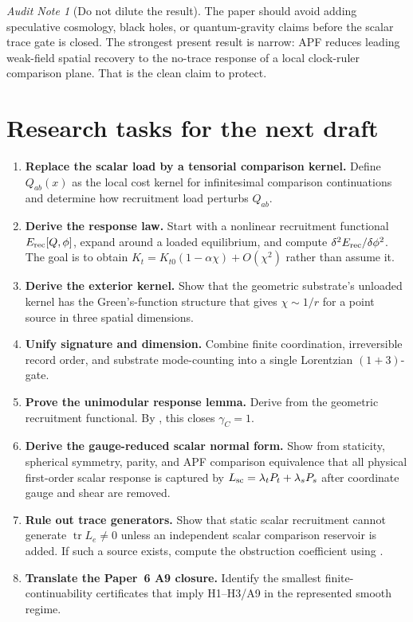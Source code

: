 \documentclass[11pt]{article}
\theoremstyle{remark}
\newtheorem{audit}[theorem]{Audit Note}
\newcommand{\Erec}{E_{\rm rec}}
\begin{document}
\begin{audit}[Do not dilute the result]
The paper should avoid adding speculative cosmology, black holes, or quantum-gravity claims before the scalar trace gate is closed.  The strongest present result is narrow: APF reduces leading weak-field spatial recovery to the no-trace response of a local clock-ruler comparison plane.  That is the clean claim to protect.
\end{audit}

\section{Research tasks for the next draft}

\begin{enumerate}
\item \textbf{Replace the scalar load by a tensorial comparison kernel.}  Define \(Q_{ab}(x)\) as the local cost kernel for infinitesimal comparison continuations and determine how recruitment load perturbs \(Q_{ab}\).
\item \textbf{Derive the response law.}  Start with a nonlinear recruitment functional \(\Erec[Q,\phi]\), expand around a loaded equilibrium, and compute \(\delta^2\Erec/\delta\phi^2\).  The goal is to obtain \(K_t=K_{t0}(1-\alpha\chi)+O(\chi^2)\) rather than assume it.
\item \textbf{Derive the exterior kernel.}  Show that the geometric substrate's unloaded kernel has the Green's-function structure that gives \(\chi\sim1/r\) for a point source in three spatial dimensions.
\item \textbf{Unify signature and dimension.}  Combine finite coordination, irreversible record order, and substrate mode-counting into a single Lorentzian \((1+3)\)-gate.
\item \textbf{Prove the unimodular response lemma.}  Derive  from the geometric recruitment functional.  By , this closes \(\gamma_C=1\).
\item \textbf{Derive the gauge-reduced scalar normal form.}  Show from staticity, spherical symmetry, parity, and APF comparison equivalence that all physical first-order scalar response is captured by \(L_{\rm sc}=\lambda_t P_t+\lambda_s P_s\) after coordinate gauge and shear are removed.
\item \textbf{Rule out trace generators.}  Show that static scalar recruitment cannot generate \(\operatorname{tr}L_e\neq0\) unless an independent scalar comparison reservoir is added.  If such a source exists, compute the obstruction coefficient using .
\item \textbf{Translate the Paper~6 A9 closure.}  Identify the smallest finite-continuability certificates that imply H1--H3/A9 in the represented smooth regime.
\end{enumerate}
\end{document}
